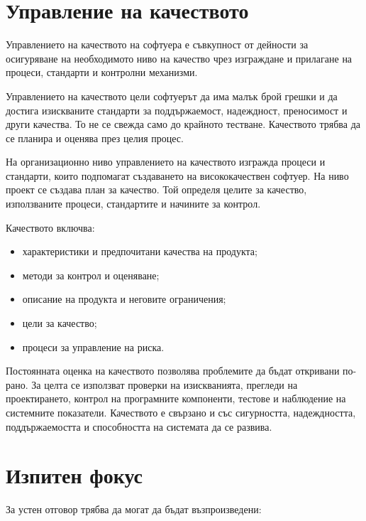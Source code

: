 \section{Управление на качеството}\label{s:26.9}

\begin{defn}
Управлението на качеството на софтуера е съвкупност от дейности за осигуряване на необходимото ниво на качество чрез изграждане и прилагане на процеси, стандарти и контролни механизми.
\end{defn}

Управлението на качеството цели софтуерът да има малък брой грешки и да достига изискваните стандарти за поддържаемост, надеждност, преносимост и други качества. То не се свежда само до крайното тестване. Качеството трябва да се планира и оценява през целия процес.

На организационно ниво управлението на качеството изгражда процеси и стандарти, които подпомагат създаването на висококачествен софтуер. На ниво проект се създава план за качество. Той определя целите за качество, използваните процеси, стандартите и начините за контрол.

Качеството включва:

\begin{itemize}
    \item характеристики и предпочитани качества на продукта;
    \item методи за контрол и оценяване;
    \item описание на продукта и неговите ограничения;
    \item цели за качество;
    \item процеси за управление на риска.
\end{itemize}

Постоянната оценка на качеството позволява проблемите да бъдат откривани по-рано. За целта се използват проверки на изискванията, прегледи на проектирането, контрол на програмните компоненти, тестове и наблюдение на системните показатели. Качеството е свързано и със сигурността, надеждността, поддържаемостта и способността на системата да се развива.

\section{Изпитен фокус}\label{s:26.10}

За устен отговор трябва да могат да бъдат възпроизведени:

